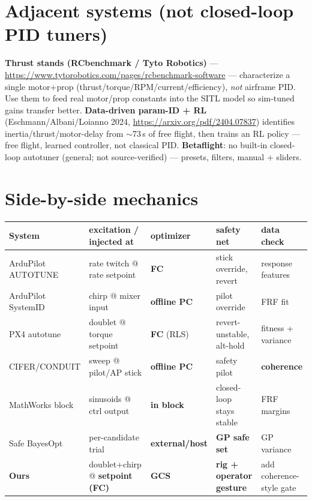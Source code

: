 \documentclass[11pt]{article}
\begin{document}
\section{Adjacent systems (not closed-loop PID tuners)}
\textbf{Thrust stands (RCbenchmark / Tyto Robotics)} ---
\url{https://www.tytorobotics.com/pages/rcbenchmark-software} --- characterize a
single motor+prop (thrust/torque/RPM/current/efficiency), \emph{not} airframe PID.
Use them to feed real motor/prop constants into the SITL model so sim-tuned gains
transfer better. \textbf{Data-driven param-ID + RL} (Eschmann/Albani/Loianno 2024,
\url{https://arxiv.org/pdf/2404.07837}) identifies inertia/thrust/motor-delay from
$\sim$73\,s of free flight, then trains an RL policy --- free flight, learned
controller, not classical PID. \textbf{Betaflight}: no built-in closed-loop
autotuner (general; not source-verified) --- presets, filters, manual + sliders.

\section{Side-by-side mechanics}
\begin{center}\small
\begin{tabularx}{\linewidth}{@{}lXXll@{}}
\toprule
System & excitation / injected at & optimizer & safety net & data check\\
\midrule
ArduPilot AUTOTUNE & rate twitch @ rate setpoint & \textbf{FC} & stick override, revert & response features\\
ArduPilot SystemID & chirp @ mixer input & \textbf{offline PC} & pilot override & FRF fit\\
PX4 autotune & doublet @ torque setpoint & \textbf{FC} (RLS) & revert-unstable, alt-hold & fitness + variance\\
CIFER/CONDUIT & sweep @ pilot/AP stick & \textbf{offline PC} & safety pilot & \textbf{coherence}\\
MathWorks block & sinusoids @ ctrl output & \textbf{in block} & closed-loop stays stable & FRF margins\\
Safe BayesOpt & per-candidate trial & \textbf{external/host} & \textbf{GP safe set} & GP variance\\
\textbf{Ours} & doublet+chirp @ \textbf{setpoint (FC)} & \textbf{GCS} & \textbf{rig + operator gesture} & add coherence-style gate\\
\bottomrule
\end{tabularx}
\end{center}
\end{document}
